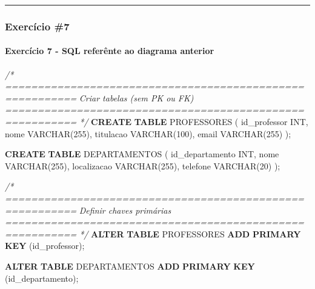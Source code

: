 \documentclass[
]{book}
\newenvironment{Shaded}{\begin{snugshade}}{\end{snugshade}}
\newcommand{\CommentTok}[1]{\textcolor[rgb]{0.56,0.35,0.01}{\textit{#1}}}
\newcommand{\DataTypeTok}[1]{\textcolor[rgb]{0.13,0.29,0.53}{#1}}
\newcommand{\DecValTok}[1]{\textcolor[rgb]{0.00,0.00,0.81}{#1}}
\newcommand{\KeywordTok}[1]{\textcolor[rgb]{0.13,0.29,0.53}{\textbf{#1}}}
\newcommand{\NormalTok}[1]{#1}
\begin{document}
\begin{center}\rule{0.5\linewidth}{0.5pt}\end{center}

\subsubsection{Exercício \#7}\label{exercuxedcio-7}



\paragraph{Exercício 7 - SQL referênte ao diagrama anterior}\label{exercuxedcio-7---sql-referuxeante-ao-diagrama-anterior}

\begin{Shaded}
\begin{Highlighting}[]
\CommentTok{/* =========================================================}
\CommentTok{   Criar tabelas (sem PK ou FK)}
\CommentTok{   ========================================================= */}
\KeywordTok{CREATE} \KeywordTok{TABLE}\NormalTok{ PROFESSORES }
\NormalTok{(}
\NormalTok{    id\_professor }\DataTypeTok{INT}\NormalTok{,}
\NormalTok{    nome }\DataTypeTok{VARCHAR}\NormalTok{(}\DecValTok{255}\NormalTok{),}
\NormalTok{    titulacao }\DataTypeTok{VARCHAR}\NormalTok{(}\DecValTok{100}\NormalTok{),}
\NormalTok{    email }\DataTypeTok{VARCHAR}\NormalTok{(}\DecValTok{255}\NormalTok{)}
\NormalTok{);}

\KeywordTok{CREATE} \KeywordTok{TABLE}\NormalTok{ DEPARTAMENTOS }
\NormalTok{(}
\NormalTok{    id\_departamento }\DataTypeTok{INT}\NormalTok{,}
\NormalTok{    nome }\DataTypeTok{VARCHAR}\NormalTok{(}\DecValTok{255}\NormalTok{),}
\NormalTok{    localizacao }\DataTypeTok{VARCHAR}\NormalTok{(}\DecValTok{255}\NormalTok{),}
\NormalTok{    telefone }\DataTypeTok{VARCHAR}\NormalTok{(}\DecValTok{20}\NormalTok{)}
\NormalTok{);}

\CommentTok{/* =========================================================}
\CommentTok{   Definir chaves primárias}
\CommentTok{   ========================================================= */}
\KeywordTok{ALTER} \KeywordTok{TABLE}\NormalTok{ PROFESSORES }\KeywordTok{ADD} \KeywordTok{PRIMARY} \KeywordTok{KEY}\NormalTok{ (id\_professor);}

\KeywordTok{ALTER} \KeywordTok{TABLE}\NormalTok{ DEPARTAMENTOS }\KeywordTok{ADD} \KeywordTok{PRIMARY} \KeywordTok{KEY}\NormalTok{ (id\_departamento);}


\end{Highlighting}
\end{Shaded}
\end{document}
